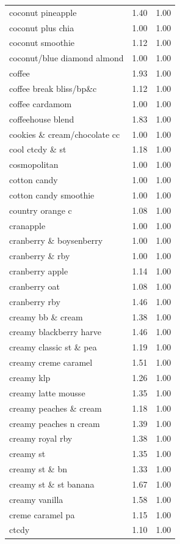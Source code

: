 \begin{table}
\begin{tabular}{lrr}
coconut pineapple & 1.40 & 1.00 \\
coconut plus chia & 1.00 & 1.00 \\
coconut smoothie & 1.12 & 1.00 \\
coconut/blue diamond almond & 1.00 & 1.00 \\
coffee & 1.93 & 1.00 \\
coffee break bliss/bp\&c & 1.12 & 1.00 \\
coffee cardamom & 1.00 & 1.00 \\
coffeehouse blend & 1.83 & 1.00 \\
cookies \& cream/chocolate cc & 1.00 & 1.00 \\
cool ctcdy \& st & 1.18 & 1.00 \\
cosmopolitan & 1.00 & 1.00 \\
cotton candy & 1.00 & 1.00 \\
cotton candy smoothie & 1.00 & 1.00 \\
country orange c & 1.08 & 1.00 \\
cranapple & 1.00 & 1.00 \\
cranberry \& boysenberry & 1.00 & 1.00 \\
cranberry \& rby & 1.00 & 1.00 \\
cranberry apple & 1.14 & 1.00 \\
cranberry oat & 1.08 & 1.00 \\
cranberry rby & 1.46 & 1.00 \\
creamy bb \& cream & 1.38 & 1.00 \\
creamy blackberry harve & 1.46 & 1.00 \\
creamy classic st \& pea & 1.19 & 1.00 \\
creamy creme caramel & 1.51 & 1.00 \\
creamy klp & 1.26 & 1.00 \\
creamy latte mousse & 1.35 & 1.00 \\
creamy peaches \& cream & 1.18 & 1.00 \\
creamy peaches n cream & 1.39 & 1.00 \\
creamy royal rby & 1.38 & 1.00 \\
creamy st & 1.35 & 1.00 \\
creamy st \& bn & 1.33 & 1.00 \\
creamy st \& st banana & 1.67 & 1.00 \\
creamy vanilla & 1.58 & 1.00 \\
creme caramel pa & 1.15 & 1.00 \\
ctcdy & 1.10 & 1.00 \\

\end{tabular}
\end{table}

